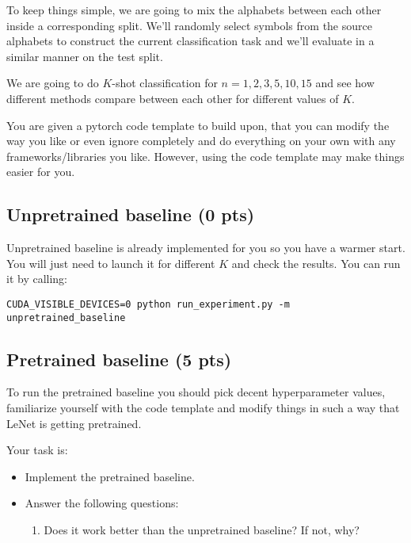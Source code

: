 \documentclass[letterpaper,12pt]{article}
\begin{document}
To keep things simple, we are going to mix the alphabets between each other inside a corresponding split.
We'll randomly select symbols from the source alphabets to construct the current classification task and we'll evaluate in a similar manner on the test split.

We are going to do $K$-shot classification for $n = 1, 2, 3, 5, 10, 15$ and see how different methods compare between each other for different values of $K$.

You are given a pytorch code template to build upon, that you can modify the way you like or even ignore completely and do everything on your own with any frameworks/libraries you like.
However, using the code template may make things easier for you.

\subsection{Unpretrained baseline (0 pts)}
Unpretrained baseline is already implemented for you so you have a warmer start.
You will just need to launch it for different $K$ and check the results.
You can run it by calling:
\begin{verbatim}
CUDA_VISIBLE_DEVICES=0 python run_experiment.py -m unpretrained_baseline
\end{verbatim}

\subsection{Pretrained baseline (5 pts)}
To run the pretrained baseline you should pick decent hyperparameter values, familiarize yourself with the code template and modify things in such a way that LeNet is getting pretrained.

Your task is:
\begin{itemize}
    \item Implement the pretrained baseline.
    \item Answer the following questions:
    \begin{enumerate}
        \item Does it work better than the unpretrained baseline? If not, why?
    \end{enumerate}
\end{itemize}
\end{document}
